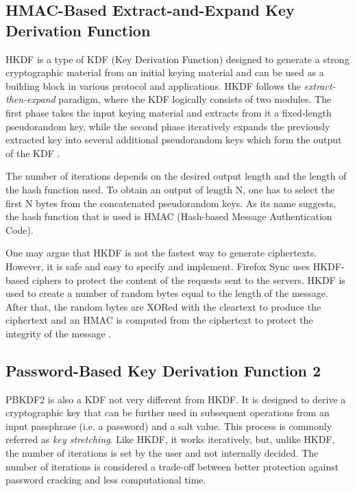 \subsection{HMAC-Based Extract-and-Expand Key Derivation Function}
\label{sub-sec:hkdf}

HKDF is a type of KDF (Key Derivation Function) designed to generate a strong cryptographic material from an initial keying material and can be used as a building block in various protocol and applications. HKDF follows the \textit{extract-then-expand} paradigm, where the KDF logically consists of two modules. The first phase takes the input keying material and extracts from it a fixed-length pseudorandom key, while the second phase iteratively expands the previously extracted key into several additional pseudorandom keys which form the output of the KDF \cite{krawczyk2010hmac}.

The number of iterations depends on the desired output length and the length of the hash function used. To obtain an output of length N, one has to select the first N bytes from the concatenated pseudorandom keys. As its name suggests, the hash function that is used is HMAC (Hash-based Message Authentication Code).

One may argue that HKDF is not the fastest way to generate ciphertexts. However, it is safe and easy to specify and implement. Firefox Sync uses HKDF-based ciphers to protect the content of the requests sent to the servers. HKDF is used to create a number of random bytes equal to the length of the message. After that, the random bytes are XORed with the cleartext to produce the ciphertext and an HMAC is computed from the ciphertext to protect the integrity of the message \cite{onepw-protocol}.

\subsection{Password-Based Key Derivation Function 2}
\label{sub-sec:pbkdf2}

PBKDF2 is also a KDF not very different from HKDF. It is designed to derive a cryptographic key that can be further used in subsequent operations from an input passphrase (i.e. a password) and a salt value. This process is commonly referred as \textit{key stretching}. Like HKDF, it works iteratively, but, unlike HKDF, the number of iterations is set by the user and not internally decided. The number of iterations is considered a trade-off between better protection against password cracking and less computational time.

